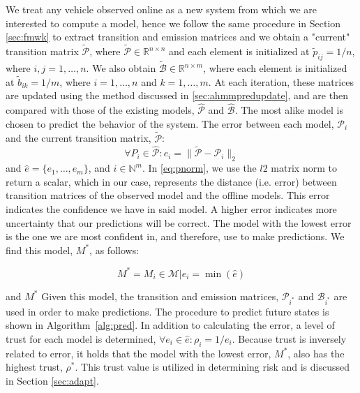 \documentclass[letterpaper, 10 pt, conference]{ieeeconf}  %
\newcommand\NB[1]{$\spadesuit$\footnote{NB: #1}}
\begin{document}
We treat any vehicle observed online as a new system from which we are interested to compute a model, hence we follow the same procedure in Section \ref{sec:fmwk} to extract transition and emission matrices and we obtain a "current" transition matrix $\tilde{\mathcal{P}}$, where $\tilde{\mathcal{P}}\in\mathbb{R}^{n\times n}$ and each element is initialized at $\tilde{p}_{ij} = 1/n$, where $i,j = 1,\ldots,n$. We also obtain $\tilde{\mathcal{B}}\in\mathbb{R}^{n\times m}$, where each element is initialized at $\tilde{b}_{ik}= 1/m$, where $i = 1,\ldots,n$ and $k=1,\ldots,m$. At each iteration, these matrices are updated using the method discussed in \ref{sec:ahmmpredupdate}, and are then compared with those of the existing models, $\hat{\mathcal{P}}$ and $\hat{\mathcal{B}}$. The most alike model is chosen to predict the behavior of the system. The error between each model, $\mathcal{P}_i$ and the current transition matrix, $\tilde{\mathcal{P}}$:
\begin{equation} \label{eq:pnorm}
    \forall{P_i} \in \hat{\mathcal{P}}: e_i = \lVert\tilde{\mathcal{P}}-\mathcal{P}_{i}\rVert_{2}
\end{equation}
and $\hat{e} = \{e_1,\ldots,e_m\}$, and $i\in\mathbb{N}^m$. In \eqref{eq:pnorm}, we use the $l2$ matrix norm to return a scalar, which in our case, represents the distance (i.e. error) between transition matrices of the observed model and the offline models. This error indicates the confidence we have in said model. A higher error indicates more uncertainty that our predictions will be correct. The model with the lowest error is the one we are most confident in, and therefore, use to make predictions. We find this model, $M^*$, as follows: %

\begin{equation}
    M^*=M_i\in\mathcal{M}\vert e_i = \min(\hat{e})
\end{equation}

and $M^*$ %
  Given this model, the transition and emission matrices, $\mathcal{P}_{i^*}$ and $\mathcal{B}_{i^*}$ are used in order to make predictions. The procedure to predict future states is shown in Algorithm~\ref{alg:pred}. In addition to calculating the error, a level of trust for each model is determined, $\forall e_i \in\hat{e}: \rho_i = 1/e_i$. Because trust is inversely related to error, it holds that the model with the lowest error, $M^*$, also has the highest trust, $\rho^*$. This trust value is utilized in determining risk and is discussed in Section \ref{sec:adapt}. 
  
\end{document}
